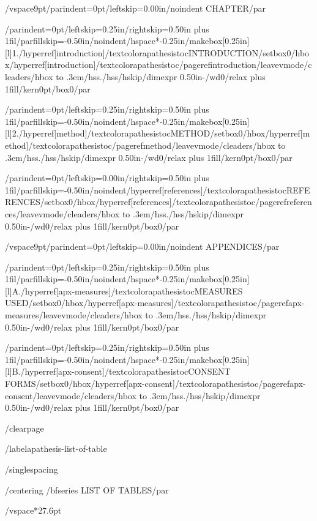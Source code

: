 {/vspace{9pt}{/parindent=0pt/leftskip=0.00in/noindent CHAPTER/par}

{/parindent=0pt/leftskip=0.25in/rightskip=0.50in plus 1fil/parfillskip=-0.50in/noindent/hspace*{-0.25in}/makebox[0.25in][l]{1.}/hyperref[introduction]{/textcolor{apathesistoc}{INTRODUCTION}}/setbox0/hbox{/hyperref[introduction]{/textcolor{apathesistoc}{/pageref{introduction}}}}/leavevmode/cleaders/hbox to .3em{/hss./hss}/hskip/dimexpr 0.50in-/wd0/relax plus 1fill/kern0pt/box0/par}

{/parindent=0pt/leftskip=0.25in/rightskip=0.50in plus 1fil/parfillskip=-0.50in/noindent/hspace*{-0.25in}/makebox[0.25in][l]{2.}/hyperref[method]{/textcolor{apathesistoc}{METHOD}}/setbox0/hbox{/hyperref[method]{/textcolor{apathesistoc}{/pageref{method}}}}/leavevmode/cleaders/hbox to .3em{/hss./hss}/hskip/dimexpr 0.50in-/wd0/relax plus 1fill/kern0pt/box0/par}

{/parindent=0pt/leftskip=0.00in/rightskip=0.50in plus 1fil/parfillskip=-0.50in/noindent/hyperref[references]{/textcolor{apathesistoc}{REFERENCES}}/setbox0/hbox{/hyperref[references]{/textcolor{apathesistoc}{/pageref{references}}}}/leavevmode/cleaders/hbox to .3em{/hss./hss}/hskip/dimexpr 0.50in-/wd0/relax plus 1fill/kern0pt/box0/par}

/vspace{9pt}{/parindent=0pt/leftskip=0.00in/noindent APPENDICES/par}

{/parindent=0pt/leftskip=0.25in/rightskip=0.50in plus 1fil/parfillskip=-0.50in/noindent/hspace*{-0.25in}/makebox[0.25in][l]{A.}/hyperref[apx-measures]{/textcolor{apathesistoc}{MEASURES USED}}/setbox0/hbox{/hyperref[apx-measures]{/textcolor{apathesistoc}{/pageref{apx-measures}}}}/leavevmode/cleaders/hbox to .3em{/hss./hss}/hskip/dimexpr 0.50in-/wd0/relax plus 1fill/kern0pt/box0/par}

{/parindent=0pt/leftskip=0.25in/rightskip=0.50in plus 1fil/parfillskip=-0.50in/noindent/hspace*{-0.25in}/makebox[0.25in][l]{B.}/hyperref[apx-consent]{/textcolor{apathesistoc}{CONSENT FORMS}}/setbox0/hbox{/hyperref[apx-consent]{/textcolor{apathesistoc}{/pageref{apx-consent}}}}/leavevmode/cleaders/hbox to .3em{/hss./hss}/hskip/dimexpr 0.50in-/wd0/relax plus 1fill/kern0pt/box0/par}

}

/clearpage

/label{apathesis-list-of-table}

/singlespacing

{/centering
/bfseries LIST OF TABLES/par}

/vspace*{27.6pt}

